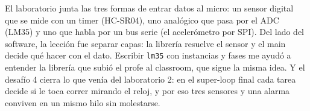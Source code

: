 \documentclass[11pt,a4paper]{article}
\begin{document}
El laboratorio junta las tres formas de entrar datos al micro: un sensor digital que se mide con
un timer (HC-SR04), uno analógico que pasa por el ADC (LM35) y uno que habla por un bus serie
(el acelerómetro por SPI). Del lado del software, la lección fue separar capas: la librería
resuelve el sensor y el main decide qué hacer con el dato. Escribir \texttt{lm35} con instancias
y fases me ayudó a entender la librería que subió el profe al classroom, que sigue la misma idea. Y el desafío 4
cierra lo que venía del laboratorio 2: en el super-loop final cada tarea decide si le toca correr
mirando el reloj, y por eso tres sensores y una alarma conviven en un mismo hilo sin molestarse.
\end{document}

